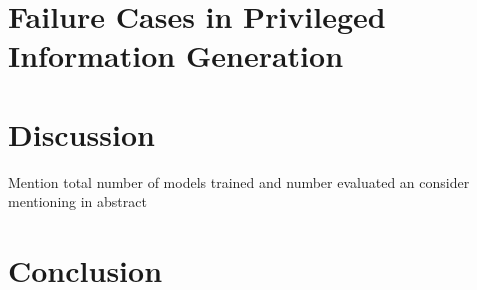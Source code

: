 
\section{Failure Cases in Privileged Information Generation}
\label{sec:5_fail_cases_priv_info_gen}



\section{Discussion}
\label{sec:5_discussion}
Mention total number of models trained and number evaluated an consider mentioning in abstract

\section{Conclusion}
\label{sec:5_conclusion}




